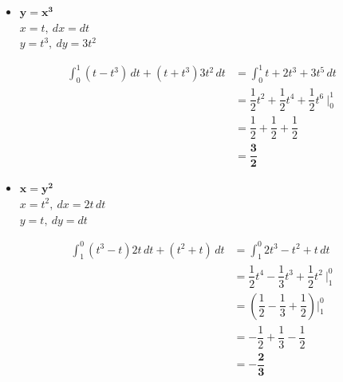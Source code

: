 \documentclass[a4paper,12pt]{article}
\begin{document}
\begin{enumerate}
\begin{enumerate}[start = 1]

        \begin{itemize}
            \item $\mathbf{y = x^{3}}$\\
                $x = t,\ dx = dt$\\
                $y = t^{3},\ dy = 3t^{2}$
        \end{itemize}

        \begin{align*}
            \int_{0}^{1} (t - t^{3})\, dt + (t +t^{3}) 3t^{2}\, dt & = \int_{0}^{1} t + 2t^{3} +3t^{5}\, dt\\
            & = \dfrac{1}{2} t^{2} + \dfrac{1}{2} t^{4} + \dfrac{1}{2} t^{6}\ \bigg|_{0}^{1}\\
            & = \dfrac{1}{2} + \dfrac{1}{2} + \dfrac{1}{2}\\
            & = \mathbf{\dfrac{3}{2}}
        \end{align*}

\newpage

        \begin{itemize}
            \item $\mathbf{x = y^{2}}$\\
                $x = t^{2},\ dx = 2t\, dt$\\
                $y = t,\ dy = dt$
        \end{itemize}

        \begin{align*}
            \int_{1}^{0} (t^{3} - t) 2t\, dt + (t^{2} + t)\, dt & = \int_{1}^{0} 2t^{3} - t^{2} + t\, dt\\
            & = \dfrac{1}{2} t^{4} - \dfrac{1}{3} t^{3} + \dfrac{1}{2} t^{2}\ \bigg|_{1}^{0}\\
            & = \left(\dfrac{1}{2} - \dfrac{1}{3} + \dfrac{1}{2}\right)\bigg|_{1}^{0}\\
            & = -\dfrac{1}{2} + \dfrac{1}{3} - \dfrac{1}{2}\\
            & = \mathbf{-\dfrac{2}{3}}
        \end{align*}


\end{enumerate}
\end{enumerate}
\end{document}
